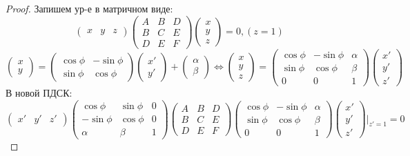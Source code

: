 \begin{proof}
Запишем ур-е в матричном виде:
\[
  \begin{pmatrix}x & y & z \end{pmatrix} \begin{pmatrix}A & B & D \\ B & C & E \\ D & E & F \end{pmatrix} \begin{pmatrix}x \\ y \\ z \end{pmatrix}  = 0, (z = 1)
\]
\[
  \begin{pmatrix}x \\ y \end{pmatrix} = \begin{pmatrix}\cos\phi & -\sin\phi \\ \sin\phi & \cos\phi \end{pmatrix}\begin{pmatrix}x' \\ y' \end{pmatrix} + \begin{pmatrix}\alpha \\ \beta \end{pmatrix} \iff \begin{pmatrix}x \\ y \\ z \end{pmatrix} = \begin{pmatrix}\cos\phi & -\sin\phi & \alpha \\ \sin\phi & \cos\phi & \beta \\
0 & 0 & 1\end{pmatrix}\begin{pmatrix}x' \\ y' \\ z' \end{pmatrix}
\]
В новой ПДСК:
\[
  \begin{pmatrix}x' & y' & z' \end{pmatrix} \begin{pmatrix}\cos\phi & \sin\phi & 0 \\ -\sin\phi & \cos\phi & 0 \\ \alpha & \beta & 1 \end{pmatrix}\begin{pmatrix}A & B & D \\ B & C & E \\ D & E & F \end{pmatrix}\begin{pmatrix}\cos\phi & -\sin\phi & \alpha \\ \sin\phi & \cos\phi & \beta \\ 0 & 0 & 1 \end{pmatrix}\begin{pmatrix}x' \\ y' \\ z' \end{pmatrix} |_{z' = 1} = 0
\]
\end{proof}
